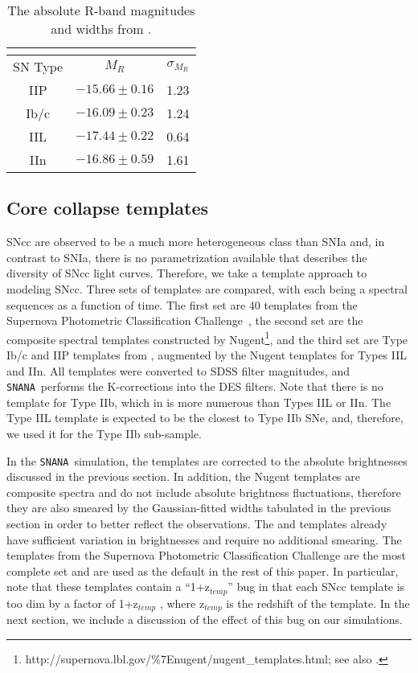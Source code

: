 \documentclass[preprint2]{aastex}    %
\newcommand{\snana}{{\tt SNANA}}
\begin{document}
\begin{table}[h]
\centering%
\begin{tabular}
[c]{|c|c|c|}\hline
\cite{li11} & &\\\hline
SN Type & $M_{R}$ & $\sigma_{M_{R}}$\\
\hline
IIP & $-15.66\pm 0.16$ & 1.23 \\
Ib/c & $-16.09\pm 0.23$ & 1.24 \\
IIL & $-17.44\pm 0.22$& 0.64 \\
IIn & $-16.86\pm 0.59$ & 1.61 \\
\hline
\end{tabular}
\caption{The absolute R-band magnitudes and widths 
from \cite{li11}.}
\label{tab:cc1li11}%
\end{table}

\subsection{Core collapse templates}

SNcc are observed to be a much more heterogeneous class than SNIa and, in contrast to SNIa, 
there is no parametrization available that describes the diversity of SNcc light curves.
Therefore, we take a template approach to modeling SNcc. 
Three sets of templates are compared, with each being a spectral 
sequences as a function of time.  The first set 
are 40 templates from the Supernova Photometric Classification 
Challenge~\citep{SNchall}, the second set are the
composite spectral templates constructed by 
Nugent\footnote{http://supernova.lbl.gov/\%7Enugent/nugent\_templates.html; see also \cite{nug02}.}, 
and the third set are Type Ib/c and IIP templates from \cite{sak11}, augmented by the 
Nugent templates for Types IIL and IIn.   
All templates were converted to SDSS filter magnitudes, and \snana\ performs the K-corrections
into the DES filters.  Note that there is no template for Type IIb,  which in \cite{li11} 
is more numerous than Types IIL or IIn.  The Type IIL template is expected to be the closest 
to Type IIb SNe, and, therefore, we used it for the Type IIb sub-sample.

In the \snana\ simulation, the templates are corrected to the absolute brightnesses 
discussed in the previous section.  In addition,  the Nugent templates are
composite spectra and do not include absolute brightness fluctuations, 
therefore they are also smeared by the Gaussian-fitted widths tabulated in the 
previous section in order to better reflect the observations.  
The \cite{SNchall} and \cite{sak11} templates already have sufficient variation in 
brightnesses and require no additional smearing.  The templates from 
the Supernova Photometric Classification Challenge are the most complete set and 
are used as the default in the rest of this paper. In particular, note 
that these templates contain a ``1+z$_{temp}$'' bug in that each SNcc 
template 
is too dim  by a factor of 1+z$_{temp}$ \citep[see Tab. 4 and $\S$2.6 of][]{SNchall}, 
where z$_{temp}$ is the redshift of the template.
In the next section, we include a discussion of the effect of this bug on 
our simulations.
\end{document}
